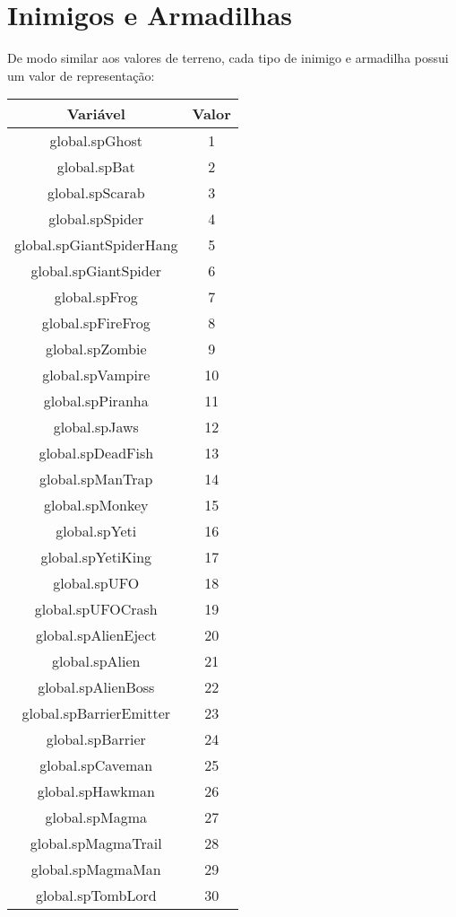 \section{Inimigos e Armadilhas}
De modo similar aos valores de terreno, cada tipo de inimigo e armadilha possui
um valor de representação:

\begin{center}
    \begin{tabular}{ |c|c| }
        \hline
        \textbf{Variável} & \textbf{Valor} \\ \hline
        global.spGhost & 1 \\ \hline
        global.spBat & 2 \\ \hline
        global.spScarab & 3 \\ \hline
        global.spSpider & 4 \\ \hline
        global.spGiantSpiderHang & 5 \\ \hline
        global.spGiantSpider & 6 \\ \hline
        global.spFrog & 7 \\ \hline
        global.spFireFrog & 8 \\ \hline
        global.spZombie & 9 \\ \hline
        global.spVampire & 10 \\ \hline
        global.spPiranha & 11 \\ \hline
        global.spJaws & 12 \\ \hline
        global.spDeadFish & 13 \\ \hline
        global.spManTrap & 14 \\ \hline
        global.spMonkey & 15 \\ \hline
        global.spYeti & 16 \\ \hline
        global.spYetiKing & 17 \\ \hline
        global.spUFO & 18 \\ \hline
        global.spUFOCrash & 19 \\ \hline
        global.spAlienEject & 20 \\ \hline
        global.spAlien & 21 \\ \hline
        global.spAlienBoss & 22 \\ \hline
        global.spBarrierEmitter & 23 \\ \hline
        global.spBarrier & 24 \\ \hline
        global.spCaveman & 25 \\ \hline
        global.spHawkman & 26 \\ \hline
        global.spMagma & 27 \\ \hline
        global.spMagmaTrail & 28 \\ \hline
        global.spMagmaMan & 29 \\ \hline
        global.spTombLord & 30 \\ \hline
    \end{tabular}
\end{center}

